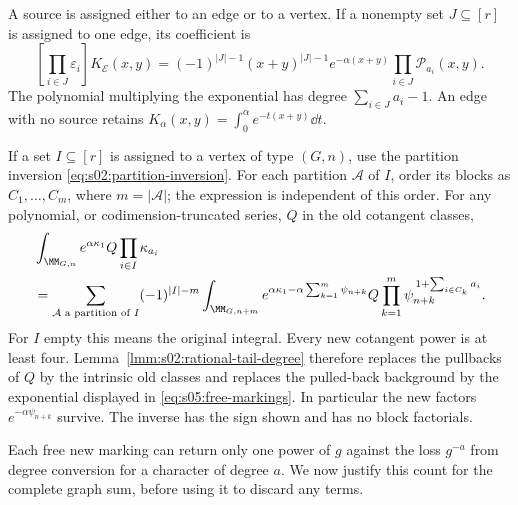 A source is assigned either to an edge or to a vertex. If a nonempty set
$J\subseteq[r]$ is assigned to one edge, its coefficient is
\begin{equation}\label{eq:s05:tagged-edge}
 [\textstyle\prod_{i\in J}\varepsilon_i]K_{\mathcal E}(x,y)
 =(-1)^{|J|-1}(x+y)^{|J|-1}e^{-\alpha(x+y)}
       \prod_{i\in J}\mathcal P_{a_i}(x,y).
\end{equation}
The polynomial multiplying the exponential has degree
$\sum_{i\in J}a_i-1$. An edge with no source retains
$K_\alpha(x,y)=\int_0^\alpha e^{-t(x+y)}\dd t$.

If a set $I\subseteq[r]$ is assigned to a vertex of type $(G,n)$,
use the partition inversion \eqref{eq:s02:partition-inversion}.
For each partition $\mathcal A$ of $I$, order its blocks as
$C_1,\ldots,C_m$, where $m=|\mathcal A|$; the expression is
independent of this order. For any polynomial, or
codimension-truncated series, $Q$ in the old cotangent classes,
\begin{align}
 &\int_{\MM_{G,n}}e^{\alpha\kappa_1}Q
                   \prod_{i\in I}\kappa_{a_i}\notag\\
 &=\sum_{\mathcal A\text{ a partition of }I}(-1)^{|I|-m}
   \int_{\MM_{G,n+m}}
    e^{\alpha\kappa_1-\alpha\sum_{k=1}^m\psi_{n+k}}
    Q
    \prod_{k=1}^m\psi_{n+k}^{\,1+\sum_{i\in C_k}a_i}.
 \label{eq:s05:free-markings}
\end{align}
For $I$ empty this means the original integral. Every new cotangent
power is at least four. Lemma~\ref{lmm:s02:rational-tail-degree}
therefore replaces the pullbacks of $Q$ by the intrinsic old classes
and replaces the pulled-back background by the exponential displayed
in \eqref{eq:s05:free-markings}. In particular the new factors
$e^{-\alpha\psi_{n+k}}$ survive. The inverse has the sign shown and
has no block factorials.

Each free new marking can return only one power of $g$ against the
loss $g^{-a}$ from degree conversion for a character of degree $a$.
We now justify this count for the complete graph sum, before using
it to discard any terms.

